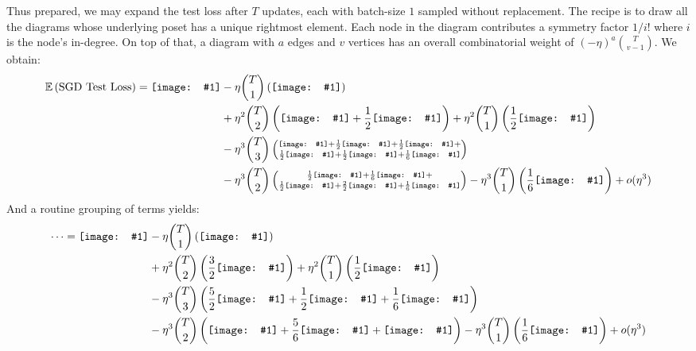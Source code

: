 \documentclass[12pt]{article}
\newcommand{\half}{\frac{1}{2}}
\newcommand{\sixth}{\frac{1}{6}}
\newcommand{\dia}[1]{\texttt{[image: \#1]}}
\begin{document}
        Thus prepared, we may expand the test loss after $T$ updates, each with batch-size $1$ sampled without
        replacement.  The recipe is to draw all the diagrams whose underlying poset has a unique rightmost element.
        Each node in the diagram contributes a symmetry factor $1/i!$ where $i$ is the node's in-degree.  On top of
        that, a diagram with $a$ edges and $v$ vertices has an overall combinatorial weight of
        $(-\eta)^a {T \choose v-1}$.  We obtain:
        \begin{align*}
            \expec \wrap{\text{SGD Test Loss}} = \dia{sgd-0}
            &- \eta   {T \choose 1} \wrap{\dia{sgd-1}} \\
            &+ \eta^2 {T \choose 2} \wrap{\dia{sgd-2a} + \half \dia{sgd-2b}}
             + \eta^2 {T \choose 1} \wrap{\half \dia{sgd-2c}} \\
            &- \eta^3 {T \choose 3} \wrap{\substack{
                    \dia{sgd-3a} + \half \dia{sgd-3b} + \half \dia{sgd-3c} + \\
                    \half \dia{sgd-3d} + \half \dia{sgd-3e} + \sixth \dia{sgd-3f}
                    }} \\  
            &- \eta^3 {T \choose 2} \wrap{\substack{
                    \half \dia{sgd-3g} + \sixth \dia{sgd-3i} + \\
                    \half \dia{sgd-3h} + \frac{2}{2} \dia{sgd-3k} + \sixth \dia{sgd-3j}
                    }} 
             - \eta^3 {T \choose 1} \wrap{\sixth \dia{sgd-3l}} 
             + o(\eta^3)
        \end{align*}
        And a routine grouping of terms yields:
        \begin{align*}
            \cdots = \dia{sgd-0}
            &- \eta   {T \choose 1} \wrap{\dia{sgd-1}} \\
            &+ \eta^2 {T \choose 2} \wrap{\frac{3}{2}\dia{sgd-2a}}
             + \eta^2 {T \choose 1} \wrap{\half \dia{sgd-2c}} \\
            &- \eta^3 {T \choose 3} \wrap{\frac{5}{2} \dia{sgd-3a} + \half \dia{sgd-3b} + \sixth \dia{sgd-3f}} \\
            &- \eta^3 {T \choose 2} \wrap{\dia{sgd-3g} + \frac{5}{6} \dia{sgd-3h} + \dia{sgd-3k}} 
             - \eta^3 {T \choose 1} \wrap{\sixth \dia{sgd-3l}} 
             + o(\eta^3)
        \end{align*}
\end{document}
